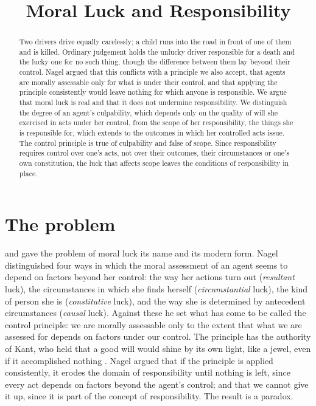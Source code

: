 \documentclass{situationist-preprint}
\title{Moral Luck and Responsibility}
\begin{document}
\maketitle

\begin{abstract}
Two drivers drive equally carelessly; a child runs into the road in front of one of them and is killed. Ordinary judgement holds the unlucky driver responsible for a death and the lucky one for no such thing, though the difference between them lay beyond their control. Nagel argued that this conflicts with a principle we also accept, that agents are morally assessable only for what is under their control, and that applying the principle consistently would leave nothing for which anyone is responsible. We argue that moral luck is real and that it does not undermine responsibility. We distinguish the degree of an agent's culpability, which depends only on the quality of will she exercised in acts under her control, from the scope of her responsibility, the things she is responsible for, which extends to the outcomes in which her controlled acts issue. The control principle is true of culpability and false of scope. Since responsibility requires control over one's acts, not over their outcomes, their circumstances or one's own constitution, the luck that affects scope leaves the conditions of responsibility in place.
\end{abstract}

\section{The problem}

\citet{Williams1976} and \citet{Nagel1976} gave the problem of moral luck its name and its modern form. Nagel distinguished four ways in which the moral assessment of an agent seems to depend on factors beyond her control: the way her actions turn out (\emph{resultant} luck), the circumstances in which she finds herself (\emph{circumstantial} luck), the kind of person she is (\emph{constitutive} luck), and the way she is determined by antecedent circumstances (\emph{causal} luck). Against these he set what has come to be called the control principle: we are morally assessable only to the extent that what we are assessed for depends on factors under our control. The principle has the authority of Kant, who held that a good will would shine by its own light, like a jewel, even if it accomplished nothing \citep[4:394]{Kant1785}. Nagel argued that if the principle is applied consistently, it erodes the domain of responsibility until nothing is left, since every act depends on factors beyond the agent's control; and that we cannot give it up, since it is part of the concept of responsibility. The result is a paradox.
\end{document}

